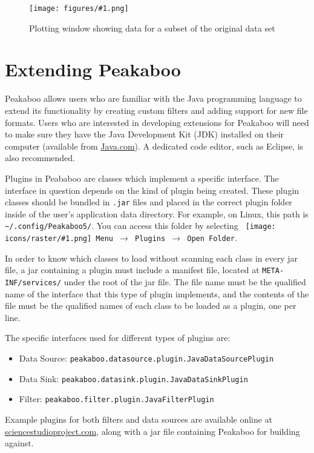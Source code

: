 \documentclass[article,twoside,11pt]{report}
\newcommand{\command}[1]{\texttt{#1}}
\newcommand{\icon}[1]{\texttt{[image: icons/raster/\#1.png]}}
\newcommand{\button}[2]{\ \command{\icon{#1} #2}}
\newcommand{\menu}[0]{$\rightarrow$}
\newcommand{\file}[1]{\command{#1}}
\newcommand{\code}[1]{\command{#1}}
\newcommand{\class}[1]{{\color{violet} \code{#1}}}
\newcommand{\screenshot}[2]{%
\begin{figure}[h!]
\centering\texttt{[image: figures/\#1.png]}
\caption{#2}
\end{figure}
}
\begin{document}
\screenshot{plot-subset}{Plotting window showing data for a subset of the original data set}



\cleardoublepage
\appendix

\chapter{Extending Peakaboo}

Peakaboo allows users who are familiar with the Java programming language to extend its functionality by creating custom filters and adding support for new file formats. Users who are interested in developing extensions for Peakaboo will need to make sure they have the Java Development Kit (JDK) installed on their computer (available from \href{http://java.com}{Java.com}). A dedicated code editor, such as Eclipse, is also recommended. 

Plugins in Peababoo are classes which implement a specific interface. The interface in question depends on the kind of plugin being created. These plugin classes should be bundled in \file{.jar} files and placed in the correct plugin folder inside of the user's application data directory. For example, on Linux, this path is \file{\textasciitilde/.config/Peakaboo5/}. You can access this folder by selecting \command{\button{main-menu}{Menu} \menu\ Plugins \menu\ Open Folder}.

In order to know which classes to load without scanning each class in every jar file, a jar containing a plugin must include a manifest file, located at \file{META-INF/services/} under the root of the jar file. The file name must be the qualified name of the interface that this type of plugin implements, and the contents of the file must be the qualified names of each class to be 
loaded as a plugin, one per line.

The specific interfaces used for different types of plugins are:
\begin{itemize}[topsep=4pt,itemsep=1pt,partopsep=0pt, parsep=0pt]
\item Data Source: \class{peakaboo.datasource.plugin.JavaDataSourcePlugin}
\item Data Sink: \class{peakaboo.datasink.plugin.JavaDataSinkPlugin}
\item Filter: \class{peakaboo.filter.plugin.JavaFilterPlugin}
\end{itemize}

Example plugins for both filters and data sources are available online at 
\href{http://sciencestudioproject.com/}{sciencestudioproject.com}, along with a jar file containing Peakaboo for building against.
\end{document}
